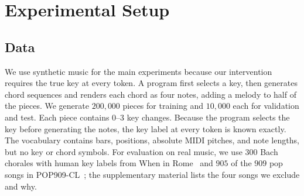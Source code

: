 \documentclass{article}
\begin{document}
\section{Experimental Setup}
\label{sec:setup}

\subsection{Data}
\label{sec:data}
We use synthetic music for the main experiments because our intervention requires the true key at every token.
A program first selects a key, then generates chord sequences and renders each chord as four notes, adding a melody to half of the pieces.
We generate $200{,}000$ pieces for training and $10{,}000$ each for validation and test.
Each piece contains $0$--$3$ key changes.
Because the program selects the key before generating the notes, the key label at every token is known exactly.
The vocabulary contains bars, positions, absolute MIDI pitches, and note lengths, but no key or chord symbols.
For evaluation on real music, we use $300$ Bach chorales with human key labels from When in Rome~\cite{gotham2023wir} and $905$ of the $909$ pop songs in POP909-CL~\cite{pop909cl2026}; the supplementary material lists the four songs we exclude and why.
\end{document}
